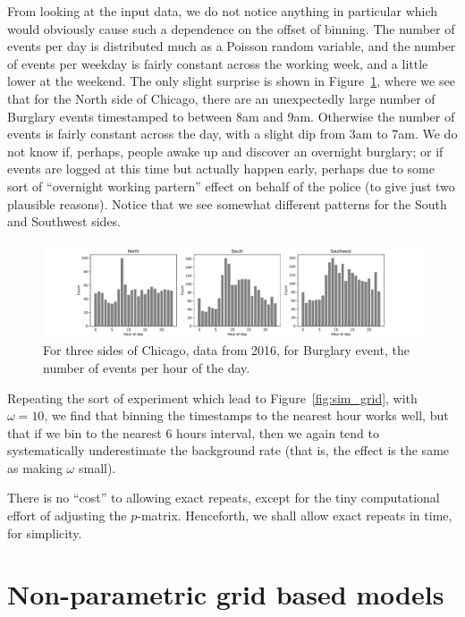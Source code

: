 \documentclass[twoside,a4paper]{article}
\theoremstyle{plain}
\theoremstyle{definition}
\begin{document}
From looking at the input data, we do not notice anything in particular which would
obviously cause such a dependence on the offset of binning.  The number of events per day
is distributed much as a Poisson random variable, and the number of events per weekday
is fairly constant across the working week, and a little lower at the weekend.  The
only slight surprise is shown in Figure~\ref{fig:by_hour_of_day}, where we see that
for the North side of Chicago, there
are an unexpectedly large number of Burglary events timestamped to between 8am and 9am.
Otherwise the number of events is fairly constant across the day, with a slight dip
from 3am to 7am.  We do not know if, perhaps, people awake up and discover an overnight
burglary; or if events are logged at this time but actually happen early, perhaps due
to some sort of ``overnight working partern'' effect on behalf of the police (to give
just two plausible reasons).  Notice that we see somewhat different patterns for the
South and Southwest sides.

\begin{figure}
  \includegraphics[width=\textwidth]{../notebooks/events_by_hour.pdf}
  \caption{For three sides of Chicago, data from 2016, for Burglary event,
the number of events per hour of the day.}
  \label{fig:by_hour_of_day}
\end{figure}

Repeating the sort of experiment which lead to Figure~\ref{fig:sim_grid}, with $\omega=10$,
we find that binning the timestamps to the nearest hour works well, but that if we bin to
the nearest 6 hours interval, then we again tend to systematically underestimate the
background rate (that is, the effect is the same as making $\omega$ small).

There is no ``cost'' to allowing exact repeats, except for the tiny computational effort
of adjusting the $p$-matrix.  Henceforth, we shall allow exact repeats in time, for simplicity.





\section{Non-parametric grid based models}
\end{document}
